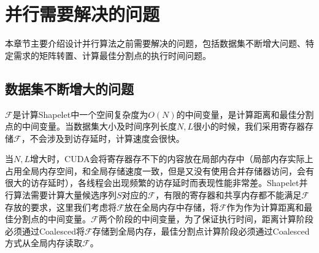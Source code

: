 

\section{并行需要解决的问题}

本章节主要介绍设计并行算法之前需要解决的问题，包括数据集不断增大问题、特定需求的矩阵转置、计算最佳分割点的执行时间问题。

\subsection{数据集不断增大的问题}
\label{cha:chap03:Problemsencountered:BigDataSet}

$\mathcal{F}$是计算Shapelet中一个空间复杂度为$O(N)$的中间变量，是计算距离和最佳分割点的中间变量。当数据集大小及时间序列长度$N,L$很小的时候，我们采用寄存器存储$\mathcal{F}$，不会涉及到访存延时，计算速度会很快。

当$N,L$增大时，CUDA会将寄存器存不下的内容放在局部内存中（局部内存实际上占用全局内存空间，和全局存储速度一致，但是又没有使用合并存储器访问，会有很大的访存延时），各线程会出现频繁的访存延时而表现性能非常差。Shapelet并行算法需要计算大量候选序列$S$对应的$\mathcal{F}$，有限的寄存器和共享内存都不能满足$\mathcal{F}$存放的要求，这里我们考虑将$\mathcal{F}$放在全局内存中存储，将$\mathcal{F}$作为作为计算距离和最佳分割点的中间变量。$\mathcal{F}$两个阶段的中间变量，为了保证执行时间，距离计算阶段必须通过Coalesced将$\mathcal{F}$存储到全局内存，最佳分割点计算阶段必须通过Coalesced方式从全局内存读取$\mathcal{F}$。

